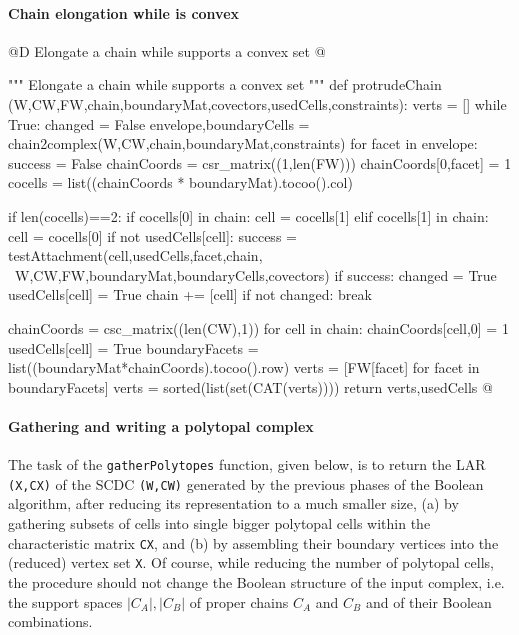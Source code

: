 \documentclass[11pt,oneside]{article}	%
\begin{document}
\paragraph{Chain elongation while is convex}

@D Elongate a chain while supports a convex set
@{""" Elongate a chain while supports a convex set """
def protrudeChain (W,CW,FW,chain,boundaryMat,covectors,usedCells,constraints):
	verts = []
	while True:	
		changed = False
		envelope,boundaryCells = chain2complex(W,CW,chain,boundaryMat,constraints)
		for facet in envelope:
			success = False
			chainCoords = csr_matrix((1,len(FW)))
			chainCoords[0,facet] = 1
			cocells = list((chainCoords * boundaryMat).tocoo().col)
			
			if len(cocells)==2:
				if cocells[0] in chain: cell = cocells[1]
				elif cocells[1] in chain: cell = cocells[0]
				if not usedCells[cell]:
					success = testAttachment(cell,usedCells,facet,chain, \
								W,CW,FW,boundaryMat,boundaryCells,covectors)
				if success: 
					changed = True
					usedCells[cell] = True
					chain += [cell]
		if not changed: break		
			
	chainCoords = csc_matrix((len(CW),1))
	for cell in chain: 
		chainCoords[cell,0] = 1
		usedCells[cell] = True
	boundaryFacets = list((boundaryMat*chainCoords).tocoo().row)
	verts = [FW[facet] for facet in boundaryFacets]
	verts = sorted(list(set(CAT(verts))))
	return verts,usedCells
@}

\paragraph{Gathering and writing a polytopal complex}
The task of the \texttt{gatherPolytopes} function, given below, is to return the LAR \texttt{(X,CX)} of the SCDC \texttt{(W,CW)} generated by the previous phases of the Boolean algorithm, after reducing its representation to a much smaller size, (a) by gathering subsets of cells into single bigger polytopal cells within the characteristic matrix \texttt{CX}, and (b) by assembling their boundary vertices into the (reduced) vertex set \texttt{X}. Of course, while reducing the number of polytopal cells, the procedure should not change the Boolean structure of the input complex, i.e. the support spaces $|C_A|, |C_B|$ of proper chains $C_A$ and $C_B$ and of their Boolean combinations.
\end{document}
